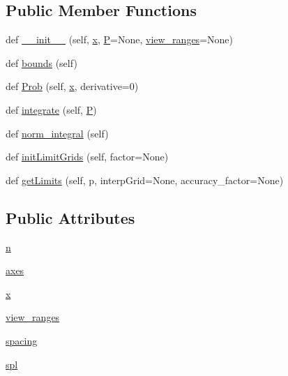 \subsection*{Public Member Functions}
\begin{DoxyCompactItemize}
\item 
def \mbox{\hyperlink{classgetdist_1_1densities_1_1Density1D_a1951d276ea29a82aeaac411fdbcffb3a}{\+\_\+\+\_\+init\+\_\+\+\_\+}} (self, \mbox{\hyperlink{classgetdist_1_1densities_1_1Density1D_afedbcf5fb7976fb479333f3f261fb70b}{x}}, \mbox{\hyperlink{classgetdist_1_1densities_1_1GridDensity_aad3d52edbfbf1a94ecbd0c779bd39dc2}{P}}=None, \mbox{\hyperlink{classgetdist_1_1densities_1_1Density1D_a5c3f4b32021c3a52169126d3ec83565e}{view\+\_\+ranges}}=None)
\item 
def \mbox{\hyperlink{classgetdist_1_1densities_1_1Density1D_a479ce6aff4b19e217f77ab4e161c2572}{bounds}} (self)
\item 
def \mbox{\hyperlink{classgetdist_1_1densities_1_1Density1D_a4b2fde67983463137942346830c4d00e}{Prob}} (self, \mbox{\hyperlink{classgetdist_1_1densities_1_1Density1D_afedbcf5fb7976fb479333f3f261fb70b}{x}}, derivative=0)
\item 
def \mbox{\hyperlink{classgetdist_1_1densities_1_1Density1D_a6422563b78860b3e11f080eed5b0ccfd}{integrate}} (self, \mbox{\hyperlink{classgetdist_1_1densities_1_1GridDensity_aad3d52edbfbf1a94ecbd0c779bd39dc2}{P}})
\item 
def \mbox{\hyperlink{classgetdist_1_1densities_1_1Density1D_a843a026a18dc4edf2ea12ee731e68c79}{norm\+\_\+integral}} (self)
\item 
def \mbox{\hyperlink{classgetdist_1_1densities_1_1Density1D_a13570bf7002783d0e46ec9e607198adc}{init\+Limit\+Grids}} (self, factor=None)
\item 
def \mbox{\hyperlink{classgetdist_1_1densities_1_1Density1D_a047d00eda8fabc15756ab9dae81a729a}{get\+Limits}} (self, p, interp\+Grid=None, accuracy\+\_\+factor=None)
\end{DoxyCompactItemize}
\subsection*{Public Attributes}
\begin{DoxyCompactItemize}
\item 
\mbox{\hyperlink{classgetdist_1_1densities_1_1Density1D_a93230b021ba34c1ea0d17d953fee3799}{n}}
\item 
\mbox{\hyperlink{classgetdist_1_1densities_1_1Density1D_acc8b83f5eafa6e281895b8122ed6e827}{axes}}
\item 
\mbox{\hyperlink{classgetdist_1_1densities_1_1Density1D_afedbcf5fb7976fb479333f3f261fb70b}{x}}
\item 
\mbox{\hyperlink{classgetdist_1_1densities_1_1Density1D_a5c3f4b32021c3a52169126d3ec83565e}{view\+\_\+ranges}}
\item 
\mbox{\hyperlink{classgetdist_1_1densities_1_1Density1D_af2d4d9d1f374788ebfc447fe2d33fd1c}{spacing}}
\item 
\mbox{\hyperlink{classgetdist_1_1densities_1_1Density1D_a065dab7698659addfd722d8ab2f94bb8}{spl}}
\end{DoxyCompactItemize}
